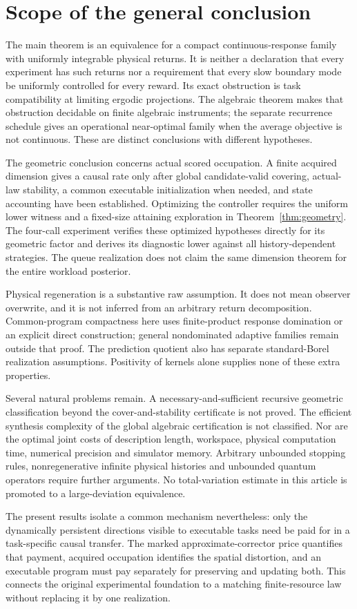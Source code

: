 \section{Scope of the general conclusion}\label{sec:scope}
The main theorem is an equivalence for a compact continuous-response family with uniformly integrable physical returns. It is neither a declaration that every experiment has such returns nor a requirement that every slow boundary mode be uniformly controlled for every reward. Its exact obstruction is task compatibility at limiting ergodic projections. The algebraic theorem makes that obstruction decidable on finite algebraic instruments; the separate recurrence schedule gives an operational near-optimal family when the average objective is not continuous. These are distinct conclusions with different hypotheses.

The geometric conclusion concerns actual scored occupation. A finite acquired dimension gives a causal rate only after global candidate-valid covering, actual-law stability, a common executable initialization when needed, and state accounting have been established. Optimizing the controller requires the uniform lower witness and a fixed-size attaining exploration in Theorem~\ref{thm:geometry}. The four-call experiment verifies these optimized hypotheses directly for its geometric factor and derives its diagnostic lower against all history-dependent strategies. The queue realization does not claim the same dimension theorem for the entire workload posterior.

Physical regeneration is a substantive raw assumption. It does not mean observer overwrite, and it is not inferred from an arbitrary return decomposition. Common-program compactness here uses finite-product response domination or an explicit direct construction; general nondominated adaptive families remain outside that proof. The prediction quotient also has separate standard-Borel realization assumptions. Positivity of kernels alone supplies none of these extra properties.

Several natural problems remain. A necessary-and-sufficient recursive geometric classification beyond the cover-and-stability certificate is not proved. The efficient synthesis complexity of the global algebraic certification is not classified. Nor are the optimal joint costs of description length, workspace, physical computation time, numerical precision and simulator memory. Arbitrary unbounded stopping rules, nonregenerative infinite physical histories and unbounded quantum operators require further arguments. No total-variation estimate in this article is promoted to a large-deviation equivalence.

The present results isolate a common mechanism nevertheless: only the dynamically persistent directions visible to executable tasks need be paid for in a task-specific causal transfer. The marked approximate-corrector price quantifies that payment, acquired occupation identifies the spatial distortion, and an executable program must pay separately for preserving and updating both. This connects the original experimental foundation to a matching finite-resource law without replacing it by one realization.
